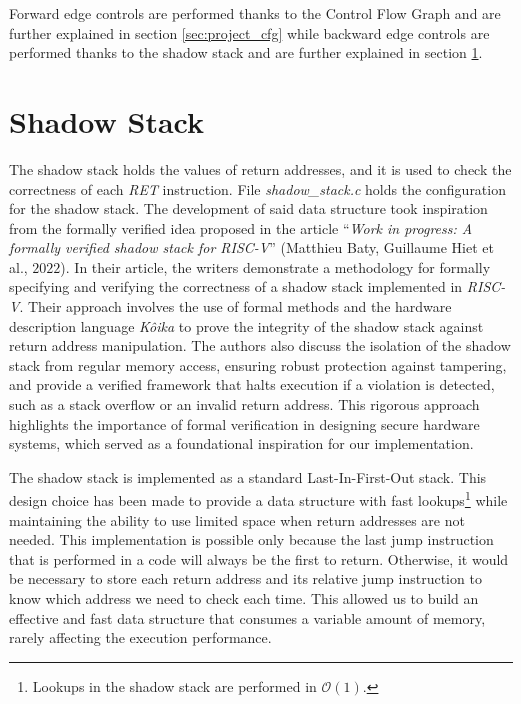 Forward edge controls are performed thanks to the Control Flow Graph and are
further explained in section \ref{sec:project_cfg} while backward edge controls
are performed thanks to the shadow stack and are further explained in section
\ref{sec:project_ss}.

\section{Shadow Stack}
\label{sec:project_ss}

The shadow stack holds the values of return addresses, and it is used to check
the correctness of each \textit{RET} instruction. File \textit{shadow\_stack.c} holds
the configuration for the shadow stack. The development of said data structure
took inspiration from the formally verified idea proposed in the article ``\textit{Work
in progress: A formally verified shadow stack for RISC-V}'' (Matthieu Baty, Guillaume
Hiet et al., $2022$)\cite{shadowstack}. In their article, the writers demonstrate
a methodology for formally specifying and verifying the correctness of a shadow stack
implemented in \textit{RISC-V}. Their approach involves the use of formal methods
and the hardware description language \textit{Kôika}\cite{koika} to prove the integrity
of the shadow stack against return address manipulation. The authors also
discuss the isolation of the shadow stack from regular memory access, ensuring robust
protection against tampering, and provide a verified framework that halts
execution if a violation is detected, such as a stack overflow or an invalid return
address. This rigorous approach highlights the importance of formal verification
in designing secure hardware systems, which served as a foundational inspiration
for our implementation.

The shadow stack is implemented as a standard Last-In-First-Out stack. This
design choice has been made to provide a data structure with fast lookups\footnote{Lookups
in the shadow stack are performed in $\mathcal{O}(1)$.} while maintaining the ability
to use limited space when return addresses are not needed. This implementation
is possible only because the last jump instruction that is performed in a code
will always be the first to return. Otherwise, it would be necessary to store
each return address and its relative jump instruction to know which address we
need to check each time. This allowed us to build an effective and fast data structure
that consumes a variable amount of memory, rarely affecting the execution
performance.


